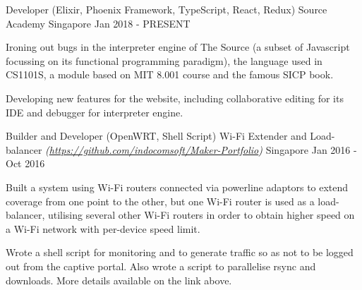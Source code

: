 \begin{cventries}
\cventry
    {Developer (Elixir, Phoenix Framework, TypeScript, React, Redux)} %
    {Source Academy} %
    {Singapore} %
    {Jan 2018 - PRESENT} %
    {
      \begin{cvitems} %
      	\item {Ironing out bugs in the interpreter engine of The Source (a subset of Javascript focussing on its functional programming paradigm), the language used in CS1101S, a module based on MIT 8.001 course and the famous SICP book.}
      	\item {Developing new features for the website, including collaborative editing for its IDE and debugger for interpreter engine.}
      \end{cvitems}
    }

\cventry
    {Builder and Developer (OpenWRT, Shell Script)} %
    {Wi-Fi Extender and Load-balancer \textmd{\em\tiny (\url{https://github.com/indocomsoft/Maker-Portfolio})}} %
    {Singapore} %
    {Jan 2016 - Oct 2016} %
    {
      \begin{cvitems} %
      	\item {Built a system using Wi-Fi routers connected via powerline adaptors to extend coverage from one point to the other, but one Wi-Fi router is used as a load-balancer, utilising several other Wi-Fi routers in order to obtain higher speed on a Wi-Fi network with per-device speed limit.}
      	\item {Wrote a shell script for monitoring and to generate traffic so as not to be logged out from the captive portal. Also wrote a script to parallelise rsync and downloads. More details available on the link above.}
      \end{cvitems}
    }
\end{cventries}
